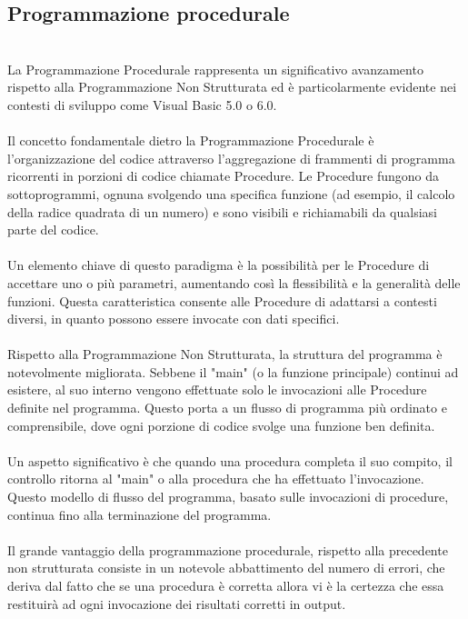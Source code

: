 \documentclass{report}
\begin{document}
\subsection{Programmazione procedurale}
\\
La Programmazione Procedurale rappresenta un significativo avanzamento rispetto alla Programmazione Non Strutturata ed è particolarmente evidente nei contesti di sviluppo come Visual Basic 5.0 o 6.0.
\\
\\
Il concetto fondamentale dietro la Programmazione Procedurale è l'organizzazione del codice attraverso l'aggregazione di frammenti di programma ricorrenti in porzioni di codice chiamate Procedure. Le Procedure fungono da sottoprogrammi, ognuna svolgendo una specifica funzione (ad esempio, il calcolo della radice quadrata di un numero) e sono visibili e richiamabili da qualsiasi parte del codice.
\\
\\
Un elemento chiave di questo paradigma è la possibilità per le Procedure di accettare uno o più parametri, aumentando così la flessibilità e la generalità delle funzioni. Questa caratteristica consente alle Procedure di adattarsi a contesti diversi, in quanto possono essere invocate con dati specifici.
\\
\\
Rispetto alla Programmazione Non Strutturata, la struttura del programma è notevolmente migliorata. Sebbene il "main" (o la funzione principale) continui ad esistere, al suo interno vengono effettuate solo le invocazioni alle Procedure definite nel programma. Questo porta a un flusso di programma più ordinato e comprensibile, dove ogni porzione di codice svolge una funzione ben definita.
\\
\\
Un aspetto significativo è che quando una procedura completa il suo compito, il controllo ritorna al "main" o alla procedura che ha effettuato l'invocazione. Questo modello di flusso del programma, basato sulle invocazioni di procedure, continua fino alla terminazione del programma.
\\
\\
Il grande vantaggio della programmazione procedurale, rispetto alla precedente non strutturata consiste in un notevole abbattimento del numero di errori, che deriva dal fatto che se una procedura è corretta allora vi è la certezza che essa restituirà ad ogni invocazione dei risultati corretti in output.
\\
\end{document}
